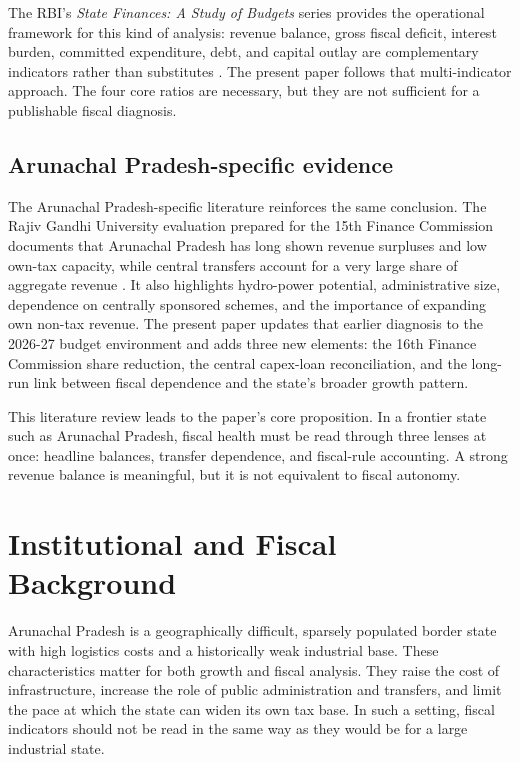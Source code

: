 \documentclass[11pt,a4paper]{article}
\begin{document}
The RBI's \emph{State Finances: A Study of Budgets} series provides the operational framework for this kind of analysis: revenue balance, gross fiscal deficit, interest burden, committed expenditure, debt, and capital outlay are complementary indicators rather than substitutes \cite{rbi_state_finances_2023}. The present paper follows that multi-indicator approach. The four core ratios are necessary, but they are not sufficient for a publishable fiscal diagnosis.

\subsection{Arunachal Pradesh-specific evidence}

The Arunachal Pradesh-specific literature reinforces the same conclusion. The Rajiv Gandhi University evaluation prepared for the 15th Finance Commission documents that Arunachal Pradesh has long shown revenue surpluses and low own-tax capacity, while central transfers account for a very large share of aggregate revenue \cite{nayak_rgu_2019}. It also highlights hydro-power potential, administrative size, dependence on centrally sponsored schemes, and the importance of expanding own non-tax revenue. The present paper updates that earlier diagnosis to the 2026-27 budget environment and adds three new elements: the 16th Finance Commission share reduction, the central capex-loan reconciliation, and the long-run link between fiscal dependence and the state's broader growth pattern.

This literature review leads to the paper's core proposition. In a frontier state such as Arunachal Pradesh, fiscal health must be read through three lenses at once: headline balances, transfer dependence, and fiscal-rule accounting. A strong revenue balance is meaningful, but it is not equivalent to fiscal autonomy.

\section{Institutional and Fiscal Background}

Arunachal Pradesh is a geographically difficult, sparsely populated border state with high logistics costs and a historically weak industrial base. These characteristics matter for both growth and fiscal analysis. They raise the cost of infrastructure, increase the role of public administration and transfers, and limit the pace at which the state can widen its own tax base. In such a setting, fiscal indicators should not be read in the same way as they would be for a large industrial state.
\end{document}
